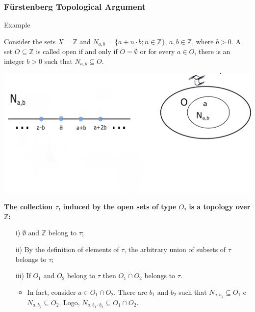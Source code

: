 \documentclass[10pt]{beamer}
\begin{document}
\begin{frame}
  \frametitle{F\"{u}rstenberg Topological Argument} 

 
    
  \begin{exampleblock}{Example}
    
Consider the sets $X = \mathbb{Z}$ and $N_{a,b} = \{ a+n \cdot b; n \in \mathbb{Z}\}$, $a, b \in
\mathbb{Z}$, where $b>0$.
A set $O \subseteq \mathbb{Z}$ is called open if and only if $O = \emptyset$ or for every $a \in O$,
there is an integer $b>0$ such that $N_{a,b} \subseteq O$.
\vspace{-7mm}
\begin{center}
\includegraphics[scale=.3]{topology.pdf}
\end{center}
\vspace{-5mm}
\textbf{The collection $\tau$, induced by the open sets of type $O$, is a topology over $\mathbb{Z}$:}
\begin{itemize}
\item[i)] $\emptyset$ and $\mathbb{Z}$ belong to   $\tau$;
 \item[ii)] By the definition of elements of $\tau$, the
 arbitrary union of subsets of $\tau$ belongs to $\tau$;
  \item[iii)] If $O_1$ and $O_2$ belong to $\tau$ then $O_1 \cap
    O_2$ belongs to $\tau$.
    \begin{itemize}
      \item In fact, consider $a \in O_1\cap O_2$. There are $b_1$ and $b_2$ such that
      $N_{a,b_1} \subseteq O_1$ e $N_{a,b_2} \subseteq O_2$. Logo,
      $N_{a,b_1\cdot b_2} \subseteq O_1 \cap O_2$. 
      \end{itemize}
        \end{itemize} 
      \end{exampleblock}

 \end{frame} 
\end{document}
